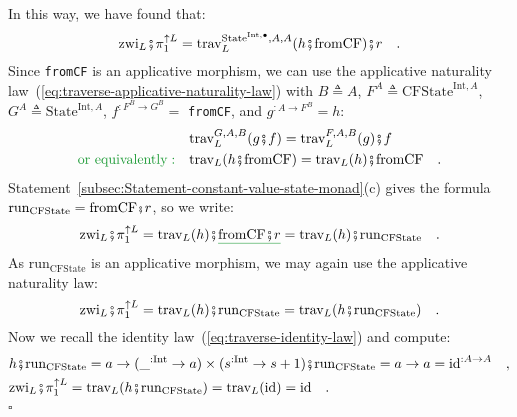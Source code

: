 In this way, we have found that:
\[
\text{zwi}_{L}\bef\pi_{1}^{\uparrow L}=\text{trav}_{L}^{\text{State}^{\text{Int},\bullet},A,A}(h\bef\text{fromCF})\bef r\quad.
\]
Since \lstinline!fromCF! is an applicative morphism, we can use the
applicative naturality law~(\ref{eq:traverse-applicative-naturality-law})
with $B\triangleq A$, $F^{A}\triangleq\text{CFState}^{\text{Int},A}$,
$G^{A}\triangleq\text{State}^{\text{Int},A}$, $f^{:F^{B}\rightarrow G^{B}}=$
\lstinline!fromCF!, and $g^{:A\rightarrow F^{B}}=h$:
\begin{align*}
 & \text{trav}_{L}^{G,A,B}(g\bef f)=\text{trav}_{L}^{F,A,B}(g)\bef f\\
{\color{greenunder}\text{or equivalently}:}\quad & \text{trav}_{L}(h\bef\text{fromCF})=\text{trav}_{L}(h)\bef\text{fromCF}\quad.
\end{align*}
Statement~\ref{subsec:Statement-constant-value-state-monad}(c) gives
the formula $\text{run}_{\text{CFState}}=\text{fromCF}\bef r$, so
we write:
\[
\text{zwi}_{L}\bef\pi_{1}^{\uparrow L}=\text{trav}_{L}(h)\bef\gunderline{\text{fromCF}\bef r}=\text{trav}_{L}(h)\bef\text{run}_{\text{CFState}}\quad.
\]
As $\text{run}_{\text{CFState}}$ is an applicative morphism, we may
again use the applicative naturality law:
\[
\text{zwi}_{L}\bef\pi_{1}^{\uparrow L}=\text{trav}_{L}(h)\bef\text{run}_{\text{CFState}}=\text{trav}_{L}(h\bef\text{run}_{\text{CFState}})\quad.
\]
Now we recall the identity law~(\ref{eq:traverse-identity-law})
and compute:
\begin{align*}
 & h\bef\text{run}_{\text{CFState}}=a\rightarrow(\_^{:\text{Int}}\rightarrow a)\times(s^{:\text{Int}}\rightarrow s+1)\bef\text{run}_{\text{CFState}}=a\rightarrow a=\text{id}^{:A\rightarrow A}\quad,\\
 & \text{zwi}_{L}\bef\pi_{1}^{\uparrow L}=\text{trav}_{L}(h\bef\text{run}_{\text{CFState}})=\text{trav}_{L}(\text{id})=\text{id}\quad.
\end{align*}
 $\square$


